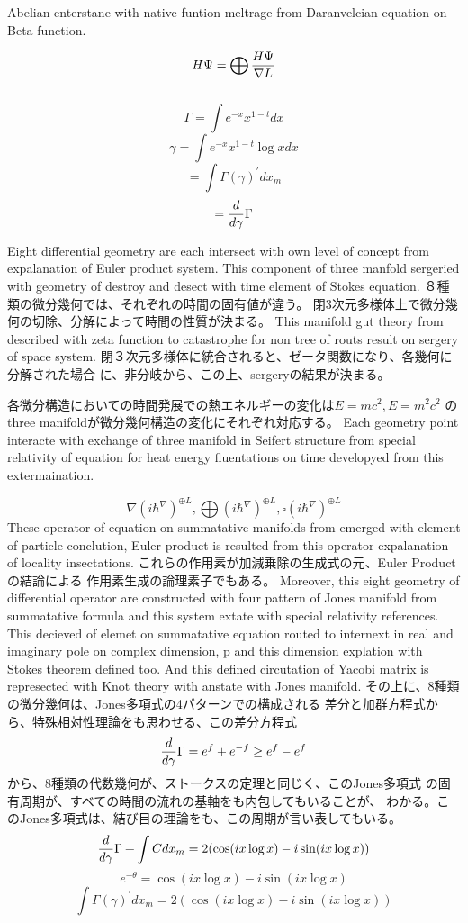 \documentclass{jsarticle}
\begin{document}
      Abelian enterstane with native funtion meltrage from Daranvelcian
      equation on Beta function.
 

   $$ H\Psi = \bigoplus {H \Psi \over \nabla L} $$
  　
 $$ \Gamma = \int e^{-x}x^{1 - t}dx $$
   $$ \gamma = \int e^{-x}x^{1 - t}\log x dx $$
   $$ = \int \Gamma(\gamma)^{'} dx_m$$
   $$ = {d \over d \gamma}\Gamma $$

   Eight differential geometry are each intersect with own level of
   concept from expalanation of Euler product system.
   This component of three manfold sergeried with geometry of destroy and
   desect with time element of Stokes equation.
   ８種類の微分幾何では、それぞれの時間の固有値が違う。
   閉3次元多様体上で微分幾何の切除、分解によって時間の性質が決まる。
   This manifold gut theory from described with zeta function to
   catastrophe for non tree of routs result on sergery of space system.
   閉３次元多様体に統合されると、ゼータ関数になり、各幾何に分解された場合
   に、非分岐から、この上、sergeryの結果が決まる。

   各微分構造においての時間発展での熱エネルギーの変化は$E=mc^2, E=m^2 c^2 $
   のthree manifoldが微分幾何構造の変化にそれぞれ対応する。
   Each geometry point interacte with exchange of three manifold in
   Seifert structure from special relativity of equation for
   heat energy fluentations on time developyed from this extermaination.

   $$ \nabla ({i \hbar^{\nabla}})^{\oplus L}, \bigoplus ({i \hbar^{\nabla}})^{
	   \oplus L}, \square ({i \hbar^{\nabla}})^{\oplus L} $$
   These operator of equation on summatative manifolds from emerged with
   element of particle conclution, Euler product is resulted from this
   operator expalanation of locality insectations.
   これらの作用素が加減乗除の生成式の元、Euler Productの結論による
   作用素生成の論理素子でもある。
   Moreover, this eight geometry of differential operator are
   constructed with four pattern of Jones manifold from
   summatative formula and this system extate with special relativity
   references. This decieved of elemet on summatative equation routed
   to internext in real and imaginary pole on complex dimension,
p  and this dimension explation with Stokes theorem defined too.
   And this defined circutation of Yacobi matrix is represected with
   Knot theory with anstate with Jones manifold.
   その上に、8種類の微分幾何は、Jones多項式の4パターンでの構成される
   差分と加群方程式から、特殊相対性理論をも思わせる、この差分方程式
   $$ {d \over d \gamma}\Gamma = e^{f} + e^{-f} \ge e^{f} - e^{f} $$
   から、8種類の代数幾何が、ストークスの定理と同じく、このJones多項式
   の固有周期が、すべての時間の流れの基軸をも内包してもいることが、
   わかる。このJones多項式は、結び目の理論をも、この周期が言い表してもいる。
   $$ {d \over d \gamma}\Gamma + \int C dx_m = 2(\cos(i x \log x) - i \sin
   (i x \log x)) $$
    $$ e^{- \theta} = \cos(i x \log x) - i \sin(i x \log x)$$
    $$ \int \Gamma(\gamma)^{'}dx_m = 2(\cos (i x \log x) 
    - i \sin(i x \log x)) $$
\end{document}
